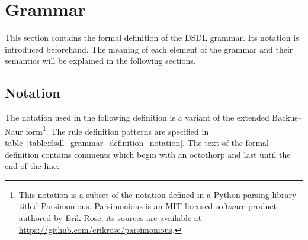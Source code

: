 \section{Grammar}\label{sec:dsdl_grammar}

This section contains the formal definition of the DSDL grammar.
Its notation is introduced beforehand.
The meaning of each element of the grammar and their semantics will be explained in the following sections.

\subsection{Notation}

The notation used in the following definition is a variant of the extended Backus--Naur
form\footnote{This notation is a subset of the notation defined in a Python parsing library titled Parsimonious.
Parsimonious is an MIT-licensed software product authored by Erik Rose;
its sources are available at \url{https://github.com/erikrose/parsimonious}.}.
The rule definition patterns are specified in table~\ref{table:dsdl_grammar_definition_notation}.
The text of the formal definition contains comments which begin with an octothorp and last until the end of the line.

